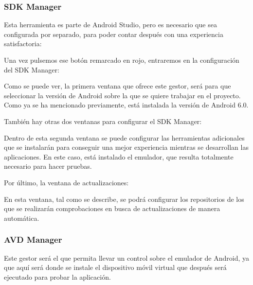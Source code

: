 \subsubsection{SDK Manager}

Esta herramienta es parte de Android Studio, pero es necesario que sea configurada por separado, para poder contar después con una experiencia satisfactoria:


Una vez pulsemos ese botón remarcado en rojo, entraremos en la configuración del SDK Manager:


Como se puede ver, la primera ventana que ofrece este gestor, será para que seleccionar la versión de Android sobre la que se quiere trabajar en el proyecto. Como ya se ha mencionado previamente, está instalada la versión de Android 6.0.

También hay otras dos ventanas para configurar el SDK Manager:


Dentro de esta segunda ventana se puede configurar las herramientas adicionales que se instalarán para conseguir una mejor experiencia mientras se desarrollan las aplicaciones. En este caso, está instalado el emulador, que resulta totalmente necesario para hacer pruebas.

Por último, la ventana de actualizaciones:


En esta ventana, tal como se describe, se podrá configurar los repositorios de los que se realizarán comprobaciones en busca de actualizaciones de manera automática.

\subsubsection{AVD Manager}

Este gestor será el que permita llevar un control sobre el emulador de Android, ya que aquí será donde se instale el dispositivo móvil virtual que después será ejecutado para probar la aplicación.


